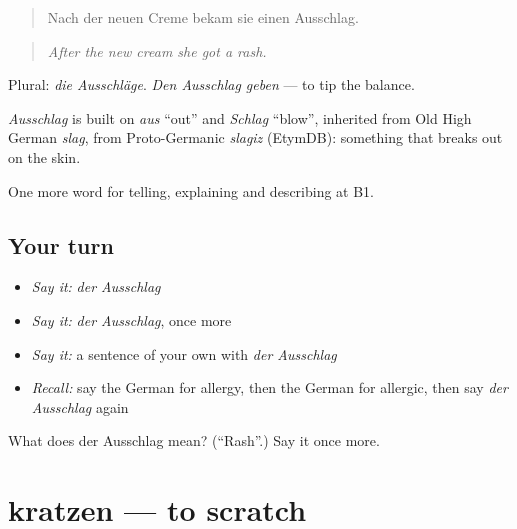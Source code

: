 \begin{quote}
Nach der neuen Creme bekam sie einen Ausschlag.
\end{quote}

\begin{quote}
\emph{After the new cream she got a rash.}
\end{quote}

Plural: \emph{die Ausschläge}. \emph{Den Ausschlag geben} — to tip the balance.

\begin{cousinweb}
\emph{Ausschlag} is built on \emph{aus} \textquotedblleft{}out\textquotedblright{} and \emph{Schlag} \textquotedblleft{}blow\textquotedblright{}, inherited from Old High German \emph{slag}, from Proto-Germanic \emph{slagiz} (EtymDB): something that breaks out on the skin.
\end{cousinweb}

\begin{grammarlens}[title={What you've built}]
One more word for telling, explaining and describing at B1.
\end{grammarlens}

\subsection*{Your turn}
\begin{itemize}
\raggedright
  \item \emph{Say it:} \emph{der Ausschlag}
  \item \emph{Say it:} \emph{der Ausschlag}, once more
  \item \emph{Say it:} a sentence of your own with \emph{der Ausschlag}
  \item \emph{Recall:} say the German for allergy, then the German for allergic, then say \emph{der Ausschlag} again
\end{itemize}

\begin{tcolorbox}[breakable,colback=teal!4,colframe=teal!35!black,title={Before you move on}]
What does der Ausschlag mean? (\textquotedblleft{}Rash\textquotedblright{}.) Say it once more.
\end{tcolorbox}
\section[kratzen]{kratzen — to scratch}

\label{lesson:GE-C481-kratzen}



